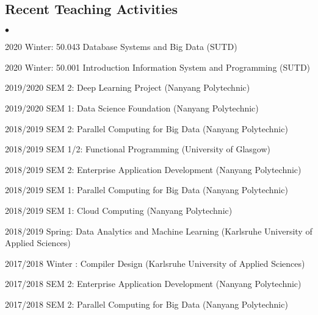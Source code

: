 \documentclass[margin,line]{res}
\newenvironment{list2}{
  \begin{list}{$\bullet$}{%
      \setlength{\itemsep}{0in}
      \setlength{\parsep}{0in} \setlength{\parskip}{0in}
      \setlength{\topsep}{0in} \setlength{\partopsep}{0in} 
      \setlength{\leftmargin}{0.2in}}}{\end{list}}
\begin{document}
\begin{resume}
\section{\sc Recent Teaching Activities}
\begin{list2}
\item 2020 Winter: 50.043 Database Systems and Big Data (SUTD)  
\item 2020 Winter: 50.001 Introduction Information System and Programming (SUTD)
\item 2019/2020 SEM 2: Deep Learning Project (Nanyang Polytechnic)
\item 2019/2020 SEM 1: Data Science Foundation (Nanyang Polytechnic)
\item 2018/2019 SEM 2: Parallel Computing for Big Data (Nanyang Polytechnic)
\item 2018/2019 SEM 1/2: Functional Programming (University of Glasgow)
\item 2018/2019 SEM 2: Enterprise Application Development (Nanyang Polytechnic)
\item 2018/2019 SEM 1: Parallel Computing for Big Data (Nanyang Polytechnic)
\item 2018/2019 SEM 1: Cloud Computing (Nanyang Polytechnic)
\item 2018/2019 Spring: Data Analytics and Machine Learning  (Karlsruhe University of Applied Sciences)
\item 2017/2018 Winter : Compiler Design (Karlsruhe University of Applied Sciences)
\item 2017/2018 SEM 2: Enterprise Application Development (Nanyang Polytechnic)
\item 2017/2018 SEM 2: Parallel Computing for Big Data (Nanyang Polytechnic)
\end{list2}



\end{resume}
\end{document}
